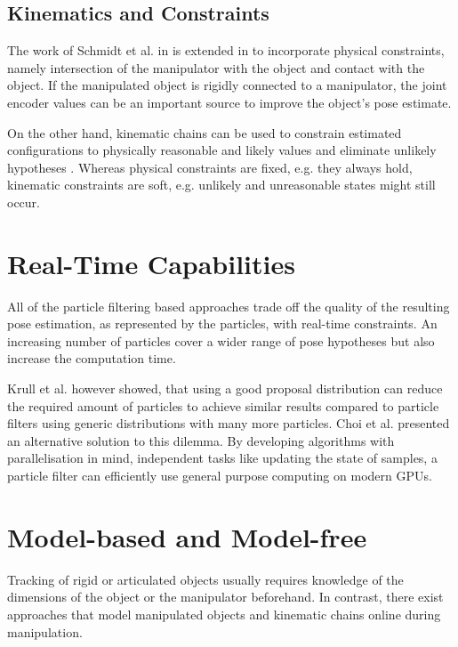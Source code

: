 \subsection{Kinematics and Constraints}

The work of Schmidt et al. in \cite{Schmidt2015} is extended in \cite{Schmidt2015b} to incorporate physical constraints, namely intersection of the manipulator with the object and contact with the object.
If the manipulated object is rigidly connected to a manipulator, the joint encoder values can be an important source to improve the object's pose estimate.

On the other hand, kinematic chains can be used to constrain estimated configurations to physically reasonable and likely values and eliminate unlikely hypotheses \cite{Shotton2013, Sharp2015}.
Whereas physical constraints are fixed, e.g. they always hold, kinematic constraints are soft, e.g. unlikely and unreasonable states might still occur.

\section{Real-Time Capabilities}

All of the particle filtering based approaches trade off the quality of the resulting pose estimation, as represented by the particles, with real-time constraints. An increasing number of particles cover a wider range of pose hypotheses but also increase the computation time.

Krull et al. \cite{Krull2015} however showed, that using a good proposal distribution can reduce the required amount of particles to achieve similar results compared to particle filters using generic distributions with many more particles. Choi et al. \cite{Choi2013} presented an alternative solution to this dilemma. By developing algorithms with parallelisation in mind, independent tasks like updating the state of samples, a particle filter can efficiently use general purpose computing on modern GPUs.


\section{Model-based and Model-free}

Tracking of rigid or articulated objects usually requires knowledge of the dimensions of the object or the manipulator beforehand. In contrast, there exist approaches that model manipulated objects and kinematic chains online during manipulation.

